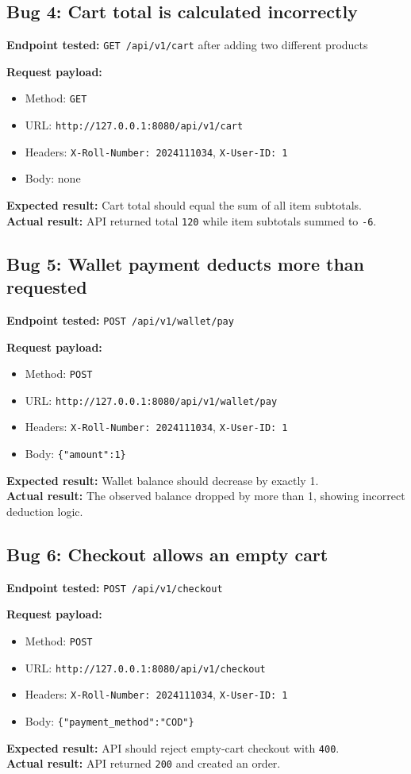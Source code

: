 \documentclass[12pt]{article}
\begin{document}
\subsection{Bug 4: Cart total is calculated incorrectly}
\textbf{Endpoint tested:} \texttt{GET /api/v1/cart} after adding two different products

\textbf{Request payload:}
\begin{itemize}
    \item Method: \texttt{GET}
    \item URL: \texttt{http://127.0.0.1:8080/api/v1/cart}
    \item Headers: \texttt{X-Roll-Number: 2024111034}, \texttt{X-User-ID: 1}
    \item Body: none
\end{itemize}
\textbf{Expected result:} Cart total should equal the sum of all item subtotals.\\
\textbf{Actual result:} API returned total \texttt{120} while item subtotals summed to \texttt{-6}.

\subsection{Bug 5: Wallet payment deducts more than requested}
\textbf{Endpoint tested:} \texttt{POST /api/v1/wallet/pay}

\textbf{Request payload:}
\begin{itemize}
    \item Method: \texttt{POST}
    \item URL: \texttt{http://127.0.0.1:8080/api/v1/wallet/pay}
    \item Headers: \texttt{X-Roll-Number: 2024111034}, \texttt{X-User-ID: 1}
    \item Body: \texttt{\{"amount":1\}}
\end{itemize}
\textbf{Expected result:} Wallet balance should decrease by exactly 1.\\
\textbf{Actual result:} The observed balance dropped by more than 1, showing incorrect deduction logic.

\subsection{Bug 6: Checkout allows an empty cart}
\textbf{Endpoint tested:} \texttt{POST /api/v1/checkout}

\textbf{Request payload:}
\begin{itemize}
    \item Method: \texttt{POST}
    \item URL: \texttt{http://127.0.0.1:8080/api/v1/checkout}
    \item Headers: \texttt{X-Roll-Number: 2024111034}, \texttt{X-User-ID: 1}
    \item Body: \texttt{\{"payment\_method":"COD"\}}
\end{itemize}
\textbf{Expected result:} API should reject empty-cart checkout with \texttt{400}.\\
\textbf{Actual result:} API returned \texttt{200} and created an order.
\end{document}
